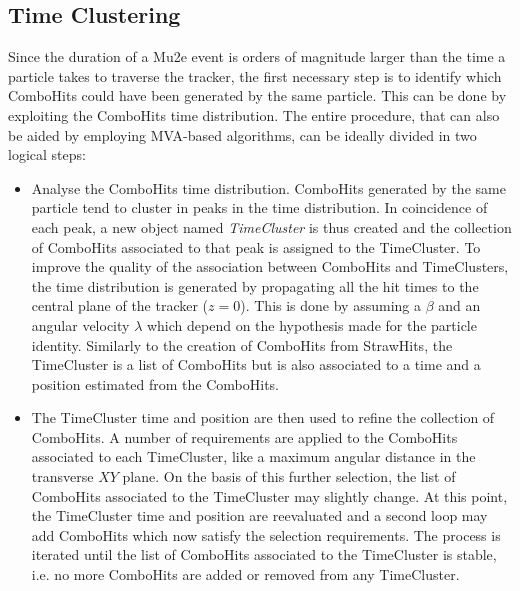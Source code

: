\documentclass[12pt,a4paper,openright, oneside, titlepage]{book} %
\begin{document}
\subsection{Time Clustering} 
Since the duration of a Mu2e event is orders of magnitude larger than the time a particle takes to traverse the tracker, the first necessary step is to identify which ComboHits could have been generated by the same particle. 
This can be done by exploiting the ComboHits time distribution.
The entire procedure, that can also be aided by employing MVA-based algorithms, can be ideally divided in two logical steps:
\begin{itemize}
\item Analyse the ComboHits time distribution. 
ComboHits generated by the same particle tend to cluster in peaks in the time distribution. 
In coincidence of each peak, a new object named {\em TimeCluster} is thus created and the collection of ComboHits associated to that peak is assigned to the TimeCluster. 
To improve the quality of the association between ComboHits and TimeClusters, the time distribution is generated by propagating all the hit times to the central plane of the tracker ($z=0$). 
This is done by assuming a $\beta$ and an angular velocity $\lambda$ which depend on the hypothesis made for the particle identity.
Similarly to the creation of ComboHits from StrawHits, the TimeCluster is a list of ComboHits but is also associated to a time and a position estimated from the ComboHits.
\item  The TimeCluster time and position are then used to refine the collection of ComboHits.
A number of requirements are applied to the ComboHits associated to each TimeCluster, like a maximum angular distance in the transverse $XY$ plane. 
On the basis of this further selection, the list of ComboHits associated to the TimeCluster may slightly change. 
At this point, the TimeCluster time and position are reevaluated and a second loop may add ComboHits which now satisfy the selection requirements. 
The process is iterated until the list of ComboHits associated to the TimeCluster is stable, i.e. no more ComboHits are added or removed from any TimeCluster.
\end{itemize}
\end{document}
